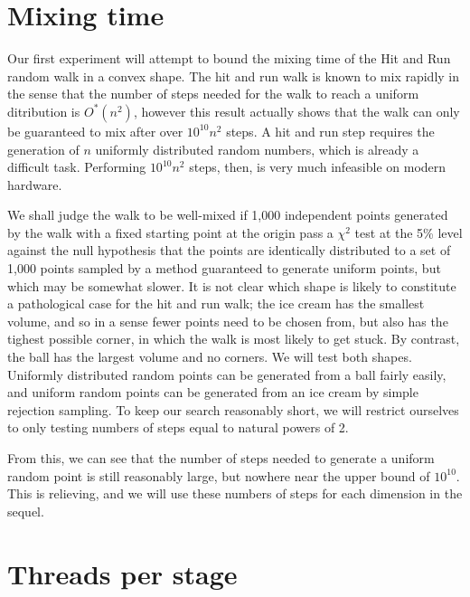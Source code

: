 \section{Mixing time}\label{sec_mix}

Our first experiment will attempt to bound the mixing time of the Hit and Run random walk in a convex shape. The hit and run walk is known to mix rapidly %
in the sense that the number of steps needed for the walk to reach a uniform ditribution is $O^{*}(n^2)$, however this result actually shows that the walk can only be guaranteed to mix after over $10^{10} n^2$
steps. A hit and run step requires the generation of $n$ uniformly distributed random numbers, which is already a difficult task. Performing $10^{10} n^2$ steps, then, is very much infeasible on modern hardware.

We shall judge the walk to be well-mixed if 1,000 independent points generated by the walk with a fixed starting point at the origin pass a $\chi^2$ test at the 5\% level against the null hypothesis that the points are identically distributed to a set of 1,000 points sampled by a method guaranteed to generate uniform points, but which may be somewhat slower. It is not clear which shape is likely to constitute a pathological case for the hit and run walk; the ice cream has the smallest volume, and so in a sense fewer points need to be chosen from, but also has the tighest possible corner, in which the walk is most likely to get stuck. By contrast, the ball has the largest volume and no corners. We will test both shapes. Uniformly distributed random points can be generated from a ball fairly easily, and uniform random points can be generated from an ice cream by simple rejection sampling. To keep our search reasonably short,  we will restrict ourselves to only testing numbers of steps equal to natural powers of 2.


From this, we can see that the number of steps needed to generate a uniform random point is still reasonably large, but nowhere near the upper bound of $10^10$. This is relieving, and we will use these numbers of steps for each dimension in the sequel.


\section{Threads per stage}\label{sec_error}

